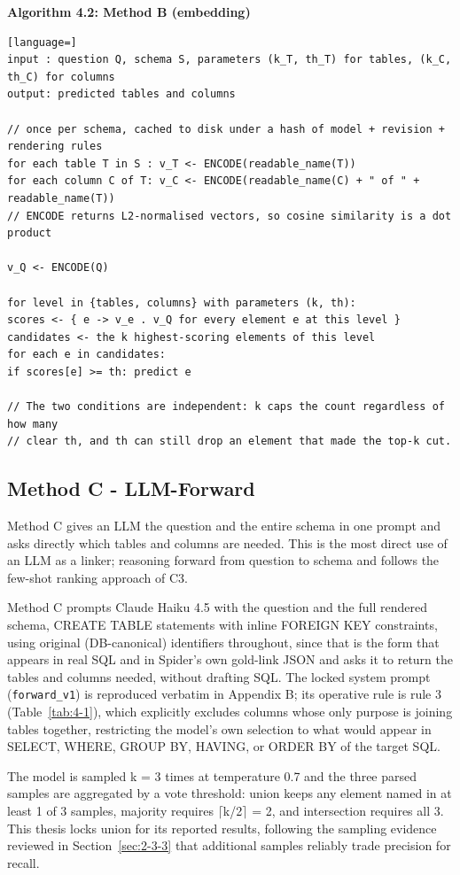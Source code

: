 \textbf{Algorithm 4.2: Method B (embedding)}

\begin{lstlisting}[language=]
input : question Q, schema S, parameters (k_T, th_T) for tables, (k_C, th_C) for columns
output: predicted tables and columns

// once per schema, cached to disk under a hash of model + revision + rendering rules
for each table T in S : v_T <- ENCODE(readable_name(T))
for each column C of T: v_C <- ENCODE(readable_name(C) + " of " + readable_name(T))
// ENCODE returns L2-normalised vectors, so cosine similarity is a dot product

v_Q <- ENCODE(Q)

for level in {tables, columns} with parameters (k, th):
scores <- { e -> v_e . v_Q for every element e at this level }
candidates <- the k highest-scoring elements of this level
for each e in candidates:
if scores[e] >= th: predict e

// The two conditions are independent: k caps the count regardless of how many
// clear th, and th can still drop an element that made the top-k cut.
\end{lstlisting}

\subsection{Method C - LLM-Forward}\label{sec:4-2-3}

Method C gives an LLM the question and the entire schema in one prompt and asks directly which tables and columns are needed. This is the most direct use of an LLM as a linker; reasoning forward from question to schema and follows the few-shot ranking approach of \citet{dong2023} C3.

Method C prompts Claude Haiku 4.5 with the question and the full rendered schema, CREATE TABLE statements with inline FOREIGN KEY constraints, using original (DB-canonical) identifiers throughout, since that is the form that appears in real SQL and in Spider's own gold-link JSON and asks it to return the tables and columns needed, without drafting SQL. The locked system prompt (\texttt{forward\_v1}) is reproduced verbatim in Appendix B; its operative rule is rule 3 (Table~\ref{tab:4-1}), which explicitly excludes columns whose only purpose is joining tables together, restricting the model's own selection to what would appear in SELECT, WHERE, GROUP BY, HAVING, or ORDER BY of the target SQL.

The model is sampled k = 3 times at temperature 0.7 and the three parsed samples are aggregated by a vote threshold: union keeps any element named in at least 1 of 3 samples, majority requires \ensuremath{\lceil}k/2\ensuremath{\rceil} = 2, and intersection requires all 3. This thesis locks union for its reported results, following the sampling evidence reviewed in Section~\ref{sec:2-3-3} that additional samples reliably trade precision for recall.

